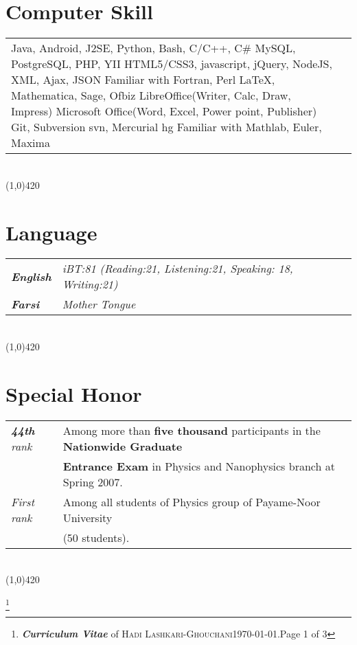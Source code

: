 \documentclass[10pt]{article}
\newcommand{\maxpages}{3}
\newcommand{\maxpages}{2}
\newcommand\HRule{\hspace*{.8cm}\line(1,0){420}\\}
\newenvironment{Record}[1]
{
    \vspace{-0.35cm}
    \section*{#1}
        \vspace{-0.1cm}
        \begin{tabular}
}
{
        \end{tabular}\\
        \HRule
}
\newcommand{\FootNote}[1]{\let\thefootnote\relax\footnote{\textbf{\textit{Curriculum Vitae}} of \textsc{Hadi Lashkari-Ghouchani}\qquad\today.\qquad Page #1 of \maxpages}}
\begin{document}
\begin{Record}{Computer Skill}{l l}
    \ComputerSkill{Programming}
        {Java, Android, J2SE, Python, Bash, C/C++, C\#}
        {MySQL, PostgreSQL, PHP, YII}
        {HTML5/CSS3, javascript, jQuery, NodeJS, XML, Ajax, JSON}
        {Familiar with Fortran, Perl}{}%
    \ComputerSkill{OS}{Linux(Ubuntu, Debian, OpenSUSE), Windows}{}{}{}{}%
    \ComputerSkill{Special Software}
        {\LaTeX, Mathematica, Sage, Ofbiz}
        {LibreOffice(Writer, Calc, Draw, Impress)}
        {Microsoft Office(Word, Excel, Power point, Publisher)}
        {Git, Subversion svn, Mercurial hg}
        {Familiar with Mathlab, Euler, Maxima}%
\end{Record}


\newcommand{\Language}[2]{
    \textbf{\textsl{#1}}&\textit{#2}\\
}
\begin{Record}{Language}{l l}
    \Language{English}
        {iBT:81 (Reading:21, Listening:21, Speaking: 18, Writing:21)}%
    \Language{Farsi}{Mother Tongue}%
\end{Record}

\newcommand{\SpecialHonor}[3]{
    \textsl{ #1}&#2\\
    &#3\\
}
\begin{Record}{Special Honor}{l l}
    \SpecialHonor{\textbf{44th} rank}
        {Among more than \textbf{five thousand} participants in the \textbf{Nationwide Graduate}}
        {\textbf{Entrance Exam} in Physics and Nanophysics branch at Spring 2007.}%
    \SpecialHonor{First rank}
        {Among all students of Physics group of Payame-Noor University}
        {(50 students).}%
\end{Record}



\FootNote{1}

\end{document}
